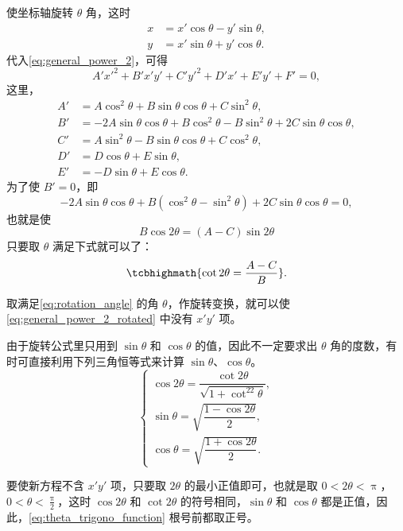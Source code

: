 使坐标轴旋转 $\theta$ 角，这时
\begin{align*}
  x &= x'\cos\theta-y'\sin\theta,\\
  y &= x'\sin\theta+y'\cos\theta.
\end{align*}
代入\cref{eq:general_power_2}，可得
\begin{equation}
  \label{eq:general_power_2_rotated}
  A'x'^2+B'x'y'+C'y'^2+D'x'+E'y'+F'=0,
\end{equation}
这里，
\begin{align*}
  A' &= A\cos^2\theta+B\sin\theta\cos\theta+C\sin^2\theta,\\
  B' &= -2A\sin\theta\cos\theta+B\cos^2\theta-B\sin^2\theta+2C\sin\theta\cos\theta,\\
  C' &= A\sin^2\theta-B\sin\theta\cos\theta+C\cos^2\theta,\\
  D' &= D\cos\theta+E\sin\theta,\\
  E' &= -D\sin\theta+E\cos\theta.
\end{align*}
为了使 $B'=0$，即
\[ -2A\sin\theta\cos\theta+ B(\cos^2\theta-\sin^2\theta)+2C\sin\theta\cos\theta=0,\]
也就是使
\[ B\cos {2\theta } = \left( {A - C}\right) \sin {2\theta }\]
只要取 $\theta$ 满足下式就可以了：
\begin{equation}
  \label{eq:rotation_angle}
\tcbhighmath{\cot2\theta=\frac{A-C}{B}}.
\end{equation}

取满足\cref{eq:rotation_angle} 的角 $\theta$，作旋转变换，就可以使\cref{eq:general_power_2_rotated} 中没有 $x'y'$ 项。

由于旋转公式里只用到 $\sin\theta$ 和 $\cos\theta$ 的值，因此不一定要求出 $\theta$ 角的度数，有时可直接利用下列三角恒等式来计算 $\sin\theta$、$\cos\theta$。
\begin{equation}
  \label{eq:theta_trigono_function}
  \begin{cases}
    \cos2\theta=\dfrac{\cot2\theta}{\sqrt{1+\cot^22\theta}},\\[15pt]
    \sin\theta=\sqrt{\dfrac{1-\cos2\theta}{2}},\\[10pt]
    \cos\theta=\sqrt{\dfrac{1+\cos2\theta}{2}}.
  \end{cases}
\end{equation}

要使新方程不含 $x'y'$ 项，只要取 $2\theta$ 的最小正值即可，也就是取 $0<2\theta< \uppi$，$0<\theta<\frac{\uppi}{2}$，这时 $\cos2\theta$ 和 $\cot2\theta$ 的符号相同，$\sin\theta$ 和 $\cos\theta$ 都是正值，因此，\cref{eq:theta_trigono_function} 根号前都取正号。

